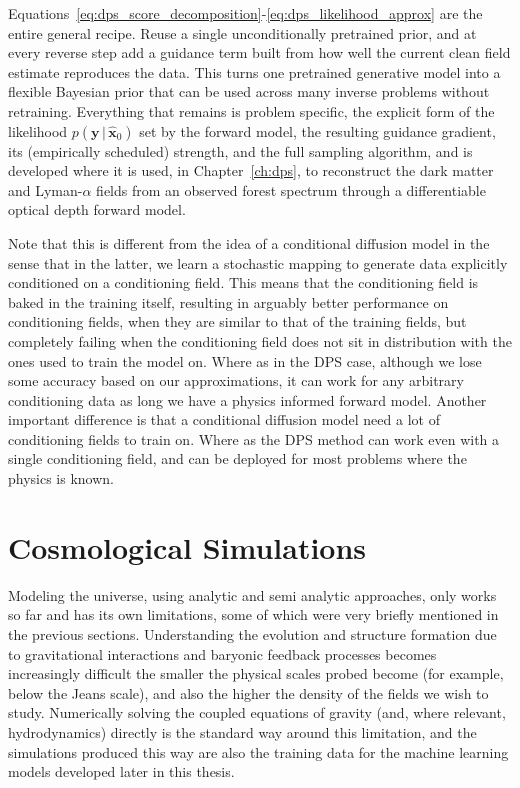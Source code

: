 Equations~\ref{eq:dps_score_decomposition}-\ref{eq:dps_likelihood_approx} are the entire general recipe. Reuse a single unconditionally pretrained prior, and at every reverse step add a guidance term built from how well the current clean field estimate reproduces the data. This turns one pretrained generative model into a flexible Bayesian prior that can be used across many inverse problems without retraining. Everything that remains is problem specific, the explicit form of the likelihood $p(\bm{y}\,|\,\hat{\bm{x}}_0)$ set by the forward model, the resulting guidance gradient, its (empirically scheduled) strength, and the full sampling algorithm, and is developed where it is used, in Chapter~\ref{ch:dps}, to reconstruct the dark matter and Lyman-$\alpha$ fields from an observed forest spectrum through a differentiable optical depth forward model. 

\vspace{\baselineskip}

Note that this is different from the idea of a conditional diffusion model in the sense that in the latter, we learn a stochastic mapping to generate data explicitly conditioned on a conditioning field. This means that the conditioning field is baked in the training itself, resulting in arguably better performance on conditioning fields, when they are similar to that of the training fields, but completely failing when the conditioning field does not sit in distribution with the ones used to train the model on. Where as in the DPS case, although we lose some accuracy based on our approximations, it can work for any arbitrary conditioning data as long we have a physics informed forward model. Another important difference is that a conditional diffusion model need a lot of conditioning fields to train on. Where as the DPS method can work even with a single conditioning field, and can be deployed for most problems where the physics is known. 



\section{Cosmological Simulations}
\label{sec:cosmo_sims}

Modeling the universe, using analytic and semi analytic approaches, only works so far and has its own limitations, some of which were very briefly mentioned in the previous sections. Understanding the evolution and structure formation due to gravitational interactions and baryonic feedback processes becomes increasingly difficult the smaller the physical scales probed become (for example, below the Jeans scale), and also the higher the density of the fields we wish to study. Numerically solving the coupled equations of gravity (and, where relevant, hydrodynamics) directly is the standard way around this limitation, and the simulations produced this way are also the training data for the machine learning models developed later in this thesis. 

